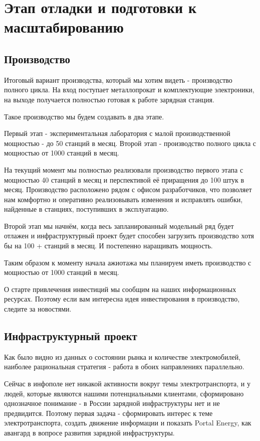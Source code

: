 \documentclass[a4paper,12pt]{report}
\begin{document}
\section{Этап отладки и подготовки к масштабированию}

\subsection{Производство} 

Итоговый вариант производства, который мы хотим видеть - производство полного цикла. На вход поступает металлопрокат и комплектующие электроники, на выходе получается полностью готовая к работе зарядная станция. 

Такое производство мы будем создавать в два этапе. 

Первый этап - экспериментальная лаборатория с малой производственной мощностью - до 50 станций в месяц. 
Второй этап - производство полного цикла с мощностью от 1000 станций в месяц. 

На текущий момент мы полностью реализовали производство первого этапа с мощностью 40 станций в месяц и перспективой её приращения до 100 штук в месяц. Производство расположено рядом с офисом разработчиков, что позволяет нам комфортно и оперативно реализовывать изменения и исправлять ошибки, найденные в станциях, поступивших в эксплуатацию.

Второй этап мы начнём, когда весь запланированный модельный ряд будет отлажен и инфраструктурный проект будет способен загрузить производство хотя бы на 100 + станций в месяц. И постепенно наращивать мощность.

Таким образом к моменту начала ажиотажа мы планируем иметь производство с мощностью от 1000 станций в месяц.

О старте привлечения инвестиций мы сообщим на наших информационных ресурсах. Поэтому если вам интересна идея инвестирования в производство, следите за новостями. 

\subsection{Инфраструктурный проект}

Как было видно из данных о состоянии рынка и количестве электромобилей, наиболее рациональная стратегия - работа в обоих направлениях параллельно.

Сейчас в инфополе нет никакой активности вокруг темы электротранспорта, и у людей, которые являются нашими потенциальными клиентами, сформировано однозначное понимание - в России зарядной инфраструктуры нет и не предвидится. Поэтому первая задача - сформировать интерес к теме электротранспорта, создать движение информации и показать Portal Energy, как авангард в вопросе развития зарядной инфраструктуры.
\end{document}
